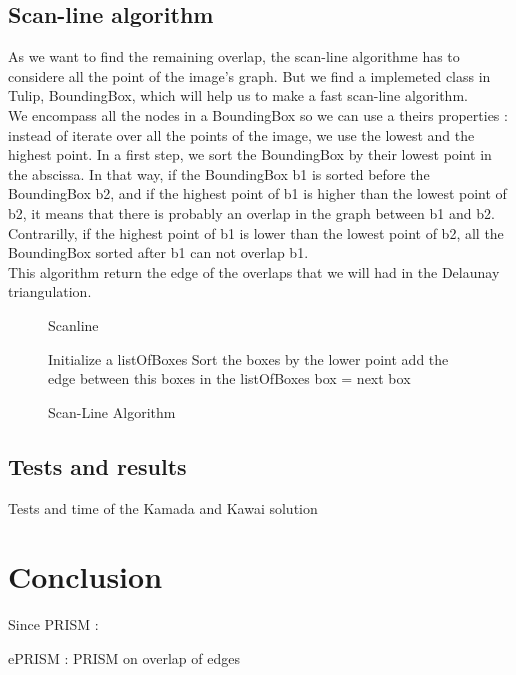 \documentclass[12pt]{report}
\begin{document}
\section{Scan-line algorithm}
As we want to find the remaining overlap, the scan-line algorithme has to considere all the point of the image's graph. But we find a implemeted class in Tulip, BoundingBox, which will help us to make a fast scan-line algorithm.\\
We encompass all the nodes in a BoundingBox so we can use a theirs properties : instead of iterate over all the points of the image, we use the lowest and the highest point. 
\bigskip
In a first step, we sort the BoundingBox by their lowest point in the abscissa. In that way, if the BoundingBox b1 is sorted before the BoundingBox b2, and if the highest point of b1 is higher than the lowest point of b2, it means that there is probably an overlap in the graph between b1 and b2. \\
Contrarilly, if the highest point of b1 is lower than the lowest point of b2, all the BoundingBox sorted after b1 can not overlap b1.\\
This algorithm return the edge of the overlaps that we will had in the Delaunay triangulation.



\begin{figure}
\begin{algorithm}[H]
\caption{Scanline}
Initialize a listOfBoxes
Sort the boxes by the lower point
	{
			{add the edge between this boxes in the listOfBoxes}
		box = next box}
\end{algorithm}
\caption{Scan-Line Algorithm}
\end{figure}


\section{Tests and results}
Tests and time of the Kamada and Kawai solution

\chapter{Conclusion}

Since PRISM :

ePRISM : PRISM on overlap of edges \cite{Hu09}
\end{document}
